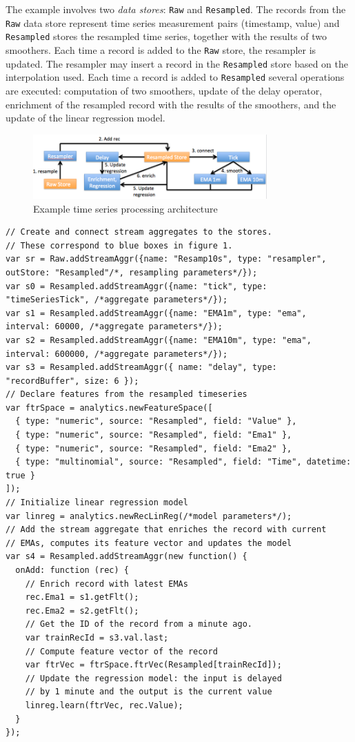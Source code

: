 \documentclass{article} %
\begin{document}
The example involves two \emph{data stores}: \texttt{Raw} and \texttt{Resampled}. The records from the \texttt{Raw} data store represent time series measurement pairs (timestamp, value) and \texttt{Resampled} stores the resampled time series, together with the results of two smoothers. Each time a record is added to the \texttt{Raw} store, the resampler is updated. The resampler may insert a record in the \texttt{Resampled} store based on the interpolation used. Each time a record is added to \texttt{Resampled} several operations are executed: computation of two smoothers, update of the delay operator, enrichment of the resampled record with the results of the smoothers, and the update of the linear regression model.

\begin{figure}[h]
\begin{center}
\includegraphics[width=0.8\textwidth]{timeSeries3.PNG}
\end{center}
\caption{Example time series processing architecture}\label{fig:timeSeries}
\end{figure}

\begin{lstlisting}[caption=Example time series processing] 	
// Create and connect stream aggregates to the stores. 
// These correspond to blue boxes in figure 1.
var sr = Raw.addStreamAggr({name: "Resamp10s", type: "resampler", outStore: "Resampled"/*, resampling parameters*/});
var s0 = Resampled.addStreamAggr({name: "tick", type: "timeSeriesTick", /*aggregate parameters*/});
var s1 = Resampled.addStreamAggr({name: "EMA1m", type: "ema", interval: 60000, /*aggregate parameters*/});
var s2 = Resampled.addStreamAggr({name: "EMA10m", type: "ema", interval: 600000, /*aggregate parameters*/});
var s3 = Resampled.addStreamAggr({ name: "delay", type: "recordBuffer", size: 6 });
// Declare features from the resampled timeseries
var ftrSpace = analytics.newFeatureSpace([
  { type: "numeric", source: "Resampled", field: "Value" },
  { type: "numeric", source: "Resampled", field: "Ema1" },
  { type: "numeric", source: "Resampled", field: "Ema2" },
  { type: "multinomial", source: "Resampled", field: "Time", datetime: true }
]);
// Initialize linear regression model
var linreg = analytics.newRecLinReg(/*model parameters*/);
// Add the stream aggregate that enriches the record with current
// EMAs, computes its feature vector and updates the model
var s4 = Resampled.addStreamAggr(new function() {
  onAdd: function (rec) {
    // Enrich record with latest EMAs
    rec.Ema1 = s1.getFlt();
    rec.Ema2 = s2.getFlt();
    // Get the ID of the record from a minute ago.
    var trainRecId = s3.val.last;
    // Compute feature vector of the record
    var ftrVec = ftrSpace.ftrVec(Resampled[trainRecId]);
    // Update the regression model: the input is delayed
    // by 1 minute and the output is the current value
    linreg.learn(ftrVec, rec.Value);
  }
});
\end{lstlisting}
\end{document}
